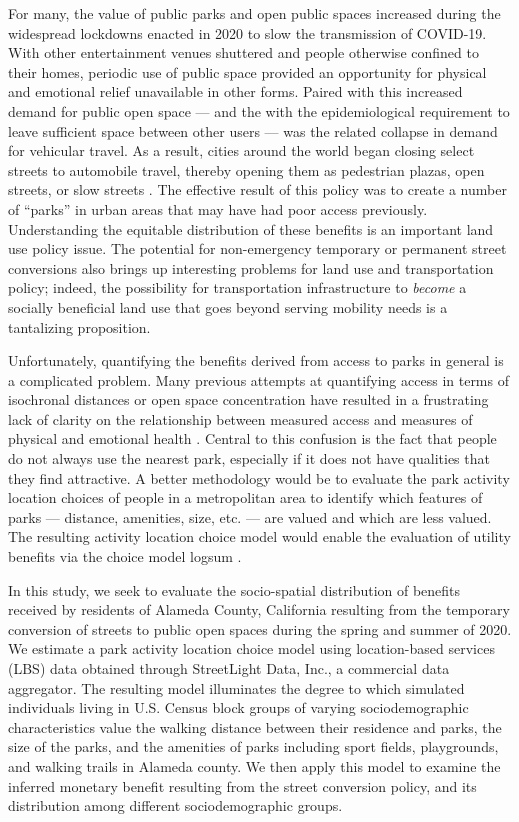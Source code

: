 \documentclass[3p, authoryear, review, doubleblind]{elsarticle} %
\begin{document}
For many, the value of public parks and open public spaces increased during the
widespread lockdowns enacted in 2020 to slow the transmission of COVID-19. With
other entertainment venues shuttered and people otherwise confined to their
homes, periodic use of public space provided an opportunity for physical and
emotional relief unavailable in other forms. Paired with this increased demand
for public open space --- and the with the epidemiological requirement to leave
sufficient space between other users --- was the related collapse in demand for
vehicular travel. As a result, cities around the world began closing select
streets to automobile travel, thereby opening them as pedestrian plazas, open
streets, or slow streets \citep{glaser_can_2021, schlossberg_rethinking_2021, combs2021shifting}. The effective result of this policy was to create a number
of ``parks'' in urban areas that may have had poor access previously.
Understanding the equitable distribution of these benefits is an important land
use policy issue. The potential for non-emergency temporary or permanent street
conversions also brings up interesting problems for land use and transportation
policy; indeed, the possibility for transportation infrastructure to \emph{become} a
socially beneficial land use that goes beyond serving mobility needs is a
tantalizing proposition.

Unfortunately, quantifying the benefits derived from access to parks in general
is a complicated problem. Many previous attempts at quantifying access in terms
of isochronal distances or open space concentration have resulted in a
frustrating lack of clarity on the relationship between measured access and
measures of physical and emotional health \citep{Bancroft2015}. Central to this
confusion is the fact that people do not always use the nearest park, especially
if it does not have qualities that they find attractive. A better methodology
would be to evaluate the park activity location choices of people in a
metropolitan area to identify which features of parks --- distance, amenities,
size, etc. --- are valued and which are less valued. The resulting activity
location choice model would enable the evaluation of utility benefits via the
choice model logsum \citep{Handy1997, DeJong2007}.

In this study, we seek to evaluate the socio-spatial distribution of benefits
received by residents of Alameda County, California resulting from the
temporary conversion of streets to public open spaces during the spring and
summer of 2020. We estimate a park activity location choice model using
location-based services (LBS) data obtained through StreetLight Data, Inc., a
commercial data aggregator. The resulting model illuminates the degree to which
simulated individuals living in U.S. Census block groups of varying
sociodemographic characteristics value the walking distance between their residence
and parks, the size of the parks, and the amenities of parks including sport
fields, playgrounds, and walking trails in Alameda county. We then apply this
model to examine the inferred monetary benefit resulting from the street
conversion policy, and its distribution among different sociodemographic groups.
\end{document}
